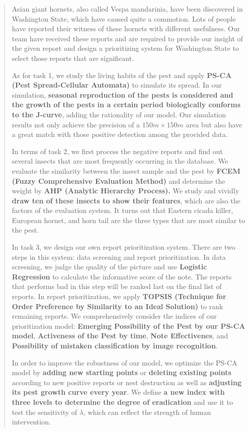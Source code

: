\begin{abstract}
\indent 

Asian giant hornets, also called Vespa mandarinia, have been discovered in Washington State, which have caused quite a commotion. Lots of people have reported their witness of these hornets with different usefulness. Our team have received these reports and are required to provide our insight of the given report and design a prioritizing system for Washington State to select those reports that are significant.

As for task 1, we study the living habits of the pest and apply \textbf{PS-CA (Pest Spread-Cellular Automata)} to simulate its spread. In our simulation,\textbf{ seasonal reproduction of the pests is considered and the growth of the pests in a certain period biologically conforms to the J-curve}, adding the rationality of our model. Our simulation results not only achieve the precision of a $150m \times 150m$ area but also have a great match with those positive detection among the provided data.

In terms of task 2, we first process the negative reports and find out several insects that are most frequently occurring in the database. We evaluate the similarity between the insect sample and the pest by \textbf{FCEM (Fuzzy Comprehensive Evaluation Method)} and determine the weight by \textbf{AHP (Analytic Hierarchy Process).} We study and vividly \textbf{draw ten of these insects to show their features}, which are also the factors of the evaluation system. It turns out that Eastern cicada killer, European hornet, and horn tail are the three types that are most similar to the pest.

In task 3, we design our own report prioritization system. There are two steps in this system: data screening and report prioritization. In data screening, we judge the quality of the picture and use \textbf{Logistic Regression} to calculate the informative score of the note. The reports that performs bad in this step will be ranked last on the final list of reports. In report prioritization, we apply \textbf{TOPSIS (Technique for Order Preference by Similarity to an Ideal Solution)} to rank remaining reports. We comprehensively consider the indices of our prioritization model: \textbf{Emerging Possibility of the Pest by our PS-CA model}, \textbf{Activeness of the Pest by time}, \textbf{Note Effectivenes}, and \textbf{Possibility of mistaken classification by image recognition}.

In order to improve the robustness of our model, we optimize the PS-CA model by \textbf{adding new starting points} or \textbf{deleting existing points} according to new positive reports or nest destruction as well as \textbf{adjusting its pest growth curve every year}. We define \textbf{a new index with three levels to determine the degree of eradication} and use it to test the sensitivity of $\lambda$, which can reflect the strength of human intervention. 


\end{abstract}
